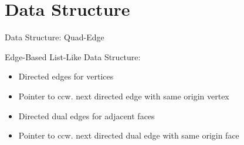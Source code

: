\documentclass[aspectratio=169,fleqn]{beamer}
\begin{document}
\section{Data Structure}
  \begin{frame}{Data Structure: Quad-Edge}
    \begin{minipage}[c]{0.49\textwidth}
      Edge-Based List-Like Data Structure:
      \onslide<+->
      \begin{itemize}
        \item<+-> Directed edges for vertices
        \item<+-> Pointer to ccw. next directed edge with same origin vertex
        \item<+-> Directed dual edges for adjacent faces
        \item<+-> Pointer to ccw. next directed dual edge with same origin face
      \end{itemize}
    \end{minipage}
    \hfill
    \begin{minipage}[c]{0.49\textwidth}
      \center

\end{minipage}
\end{frame}
\end{document}
